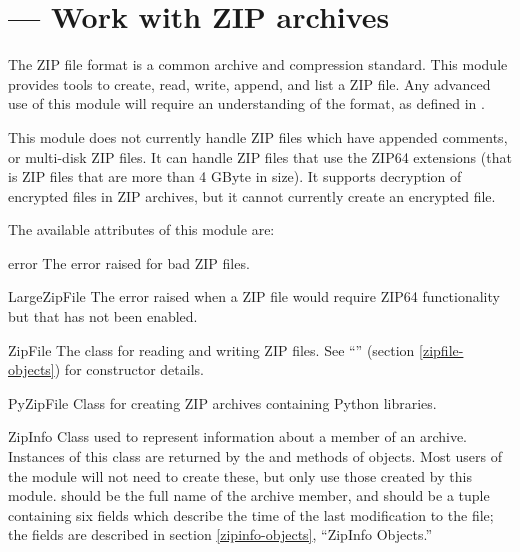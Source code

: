 \section{ ---
         Work with ZIP archives}



The ZIP file format is a common archive and compression standard.
This module provides tools to create, read, write, append, and list a
ZIP file.  Any advanced use of this module will require an
understanding of the format, as defined in
.

This module does not currently handle ZIP files which have appended
comments, or multi-disk ZIP files. It can handle ZIP files that use
the ZIP64 extensions (that is ZIP files that are more than 4 GByte in
size).  It supports decryption of encrypted files in ZIP archives, but
it cannot currently create an encrypted file.  

The available attributes of this module are:

\begin{excdesc}{error}
  The error raised for bad ZIP files.
\end{excdesc}

\begin{excdesc}{LargeZipFile}
  The error raised when a ZIP file would require ZIP64 functionality but that
  has not been enabled.
\end{excdesc}

\begin{classdesc*}{ZipFile}
  The class for reading and writing ZIP files.  See
  ``'' (section \ref{zipfile-objects}) for
  constructor details.
\end{classdesc*}

\begin{classdesc*}{PyZipFile}
  Class for creating ZIP archives containing Python libraries.
\end{classdesc*}

\begin{classdesc}{ZipInfo}{}
  Class used to represent information about a member of an archive.
  Instances of this class are returned by the  and
   methods of  objects.  Most users
  of the  module will not need to create these, but
  only use those created by this module.
   should be the full name of the archive member, and
   should be a tuple containing six fields which
  describe the time of the last modification to the file; the fields
  are described in section \ref{zipinfo-objects}, ``ZipInfo Objects.''
\end{classdesc}

